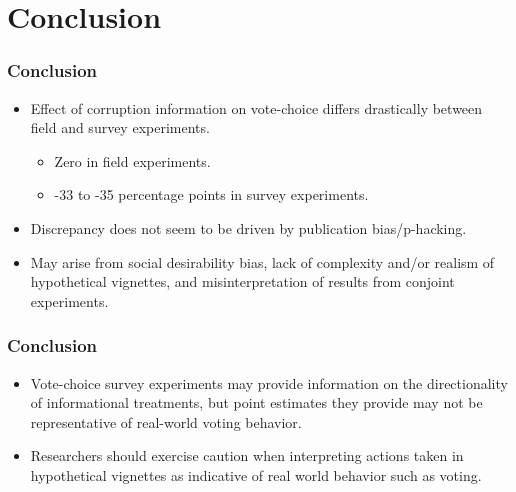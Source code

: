 \documentclass[usenames,dvipsnames]{beamer}
\begin{document}
\section{Conclusion}

\begin{frame}
\frametitle{Conclusion}
\begin{itemize}
\pause
\item Effect of corruption information on vote-choice \textcolor{Cerulean}{differs drastically} between field and survey experiments.
\begin{itemize}
\pause
\item \textcolor{Cerulean}{Zero} in field experiments.
\item \textcolor{Cerulean}{-33 to -35 percentage points} in survey experiments. 
\end{itemize}
\pause
\item Discrepancy does not seem to be driven by publication bias/p-hacking.
\pause
\item May arise from social desirability bias, lack of complexity and/or realism of hypothetical vignettes, and misinterpretation of results from conjoint experiments.

\end{itemize}
\end{frame}


\begin{frame}
\frametitle{Conclusion}
\begin{itemize}
\item Vote-choice survey experiments may provide information on the directionality of informational treatments, but point estimates they provide may not be representative of real-world voting behavior. 
\pause
\item Researchers should exercise caution when interpreting actions taken in hypothetical vignettes as indicative of real world behavior such as voting. 
\end{itemize}

\end{frame}





\end{document}
